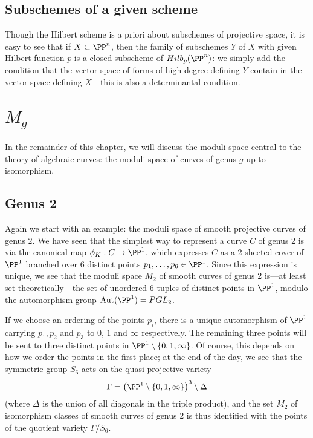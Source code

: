 \subsection{Subschemes of a given scheme}

Though the Hilbert scheme is a priori about subschemes of projective space, it is easy to see that if $X\subset \PP^n$,
then the family of subschemes $Y$ of $X$ with given Hilbert function $p$ is a closed subscheme of $Hilb_p(\PP^n)$: we simply
add the condition that the vector space of forms of high degree defining $Y$  contain in the vector space defining $X$---this is also a determinantal condition.


\section{$M_g$}

In the remainder of this chapter, we will discuss the moduli space central to the theory of algebraic curves: the moduli space of curves of genus $g$ up to isomorphism.

\subsection{Genus 2}                                                                                             

Again we start with an example: the moduli space of smooth projective curves of genus $2$. We have seen that the simplest way to represent a curve $C$ of genus 2 is via the canonical map $\phi_K : C \to \PP^1$, which expresses $C$ as a 2-sheeted cover of $\PP^1$ branched over 6 distinct points $p_1,\dots,p_6 \in \PP^1$. Since this expression is unique, we see that the moduli space $M_2$ of smooth curves of genus 2 is---at least set-theoretically---the set of unordered 6-tuples of distinct points in $\PP^1$, modulo the automorphism group ${\rm Aut}(\PP^1) = PGL_2$.

 If we choose an ordering of the points $p_i$, there is a unique automorphism of $\PP^1$ carrying $p_1, p_2$ and $p_3$ to $0$, $1$ and $\infty$ respectively.  The remaining three points will be sent to three distinct points in $\PP^1 \setminus \{0, 1, \infty \} $. Of course, this depends on how we order the points in the first place; at the end of the day, we see that the symmetric group $S_6$ acts on the quasi-projective variety
$$
\Gamma = \left( \PP^1 \setminus \{0, 1, \infty \} \right)^3 \setminus \Delta
$$
(where $\Delta$ is the union of all diagonals in the triple product), and the set $M_2$ of isomorphism classes of smooth curves of genus 2 is thus identified with the points of the quotient variety $\Gamma/S_6$.

